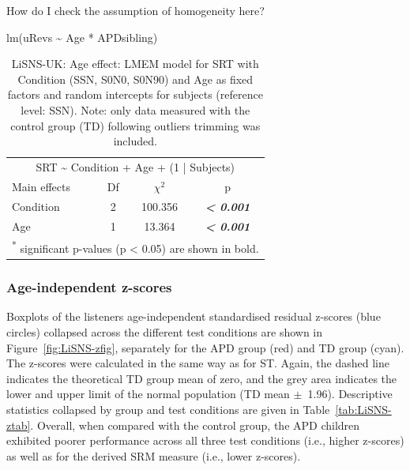 \documentclass[a4paper, twoside]{templates/ociamthesis}
\begin{document}
\begin{correction}
How do I check the assumption of homogeneity here?

lm(uRevs \textasciitilde{} Age * APDsibling)
\end{correction}

\begin{table}

\caption{\label{tab:LiSNS-AgeLMEMTab}LiSNS-UK: Age effect: LMEM model for SRT with Condition (SSN, S0N0, S0N90) and Age as fixed factors and random intercepts for subjects (reference level: SSN). Note: only data measured with the control group (TD) following outliers trimming was included.}
\centering
\begin{tabular}[t]{lcc>{}c}
\toprule
\multicolumn{4}{c}{SRT \textasciitilde{} Condition + Age + (1 | Subjects)} \\
\cmidrule(l{3pt}r{3pt}){1-4}
Main effects & Df & $\chi^{2}$ & p\\
\midrule
Condition & 2 & 100.356 & \em{\textbf{< 0.001}}\\
Age & 1 & 13.364 & \em{\textbf{< 0.001}}\\
\bottomrule
\multicolumn{4}{l}{\textsuperscript{*} significant p-values (p < 0.05) are shown in bold.}\\
\end{tabular}
\end{table}

\hypertarget{age-independent-z-scores-1}{%
\subsubsection*{Age-independent z-scores}\label{age-independent-z-scores-1}}

Boxplots of the listeners age-independent standardised residual z-scores (blue circles) collapsed across the different test conditions are shown in Figure~\ref{fig:LiSNS-zfig}, separately for the APD group (red) and TD group (cyan). The z-scores were calculated in the same way as for ST. Again, the dashed line indicates the theoretical TD group mean of zero, and the grey area indicates the lower and upper limit of the normal population (TD mean \(\pm\)~1.96). Descriptive statistics collapsed by group and test conditions are given in Table~\ref{tab:LiSNS-ztab}. Overall, when compared with the control group, the APD children exhibited poorer performance across all three test conditions (i.e., higher z-scores) as well as for the derived SRM measure (i.e., lower z-scores).\\
\end{document}
